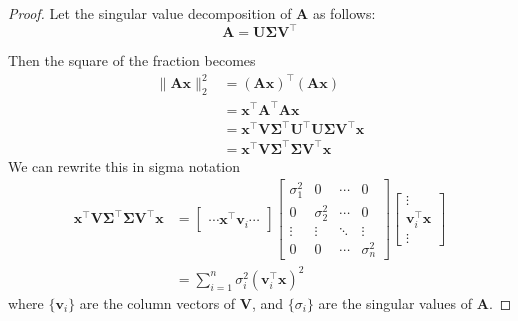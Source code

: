 \documentclass[11pt]{article}
\newcommand{\norm}[2][]{\lVert#2\rVert_{#1}}
\begin{document}
\begin{enumerate}
\begin{proof}
Let the singular value decomposition of $\bm A$ as follows:
\[\bm A=\bm{U \Sigma V}^{\top}\]

Then the square of the fraction becomes
\begin{align*}
\norm[2]{\bm{Ax}}^{2}
& =(\bm{Ax})^{\top}(\bm{Ax}) \\
& =\bm x^{\top}\bm A^{\top}\bm A\bm x \\
& =\bm x^{\top}\bm{V\Sigma}^{\top}\bm U^{\top}\bm{U\Sigma V}^{\top}\bm x \\
& =\bm x^{\top}\bm{V\Sigma}^{\top}\bm{\Sigma V}^{\top}\bm x
\end{align*}
We can rewrite this in sigma notation
\begin{align*}
\bm x^{\top}\bm{V\Sigma}^{\top}\bm{\Sigma V}^{\top}\bm x
& =\begin{bmatrix}\cdots \bm x^{\top}\bm v_{i} \cdots\end{bmatrix}
\begin{bmatrix}
    \sigma_{1}^{2} & 0 & \cdots & 0 \\
    0 & \sigma_{2}^{2} & \cdots & 0 \\
    \vdots & \vdots & \ddots & \vdots \\
    0 & 0 & \cdots & \sigma_{n}^{2}
\end{bmatrix}
\begin{bmatrix}\vdots\\\bm v_{i}^{\top}\bm x\\\vdots\end{bmatrix} \\
& =\sum_{i=1}^{n}\sigma_{i}^{2}(\bm v_{i}^{\top}\bm x)^{2}
\end{align*}
where $\{\bm v_{i}\}$ are the column vectors of $\bm V$,
and $\{\sigma_{i}\}$ are the singular values of $\bm A$.


\end{proof}
\end{enumerate}
\end{document}
